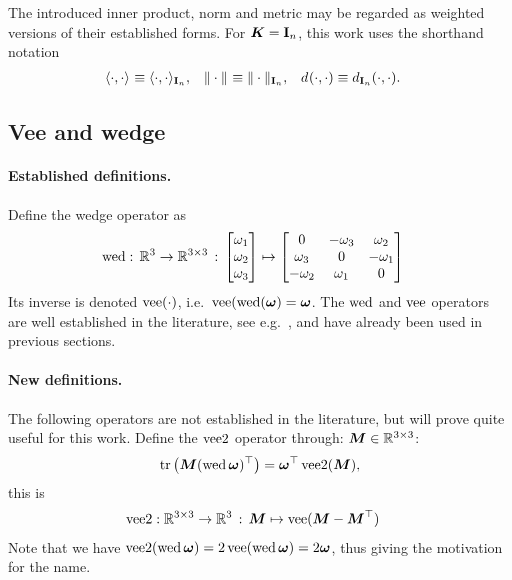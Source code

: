 The introduced inner product, norm and metric may be regarded as weighted versions of their established forms.
For $\mat{K} = \idMat[n]$, this work uses the shorthand notation
\begin{align}
 \sProd[]{\cdot}{\cdot} &\equiv \sProd[{\idMat[n]}]{\cdot}{\cdot},&
 \norm[]{\cdot} &\equiv \norm[{\idMat[n]}]{\cdot},&
 \metric[]{\cdot}{\cdot} &\equiv \metric[{\idMat[n]}]{\cdot}{\cdot}.
\end{align}


\subsection{Vee and wedge}
\paragraph{Established definitions.}
Define the wedge operator as
\begin{subequations}\label{eq:DefWedgeOpSO3}
\begin{align}
 \wedOp : \, \RealNum^3 \rightarrow \RealNum^{3\times3} \, : \, \begin{bmatrix} \omega_1 \\ \omega_2 \\ \omega_3 \end{bmatrix} &\mapsto \begin{bmatrix} 0 & -\omega_3 & \omega_2 \\ \omega_3 & 0 & -\omega_1 \\ -\omega_2 & \omega_1 & 0 \end{bmatrix}
\end{align}
\end{subequations}
Its inverse is denoted $\veeOp(\cdot)$, i.e.\ $\veeOp(\wedOp(\w)=\w$.
The $\wedOp$ and $\veeOp$ operators are well established in the literature, see e.g.\ \cite[sec.\ 2.3.2]{Murray:Robotic}, and have already been used in previous sections.

\paragraph{New definitions.}
The following operators are not established in the literature, but will prove quite useful for this work.
Define the $\veeTwoOp$ operator through: $\mat{M}\in\RealNum^{3\times3}$:
\begin{align}\label{eq:EqVeeTwoOpSO3}
 \tr\big( \mat{M} (\wedOp\tuple{\omega})^\top \big) = \tuple{\omega}^\top \veeTwoOp(\mat{M}),
\end{align}
this is
\begin{align}
 \veeTwoOp &: \RealNum^{3\times 3} \rightarrow \RealNum^3 \, : \, \mat{M} \mapsto \veeOp(\mat{M}-\mat{M}^\top)
\end{align}
Note that we have $\veeTwoOp(\wedOp{\w}) = 2\veeOp(\wedOp{\w}) = 2\w$, thus giving the motivation for the name.

